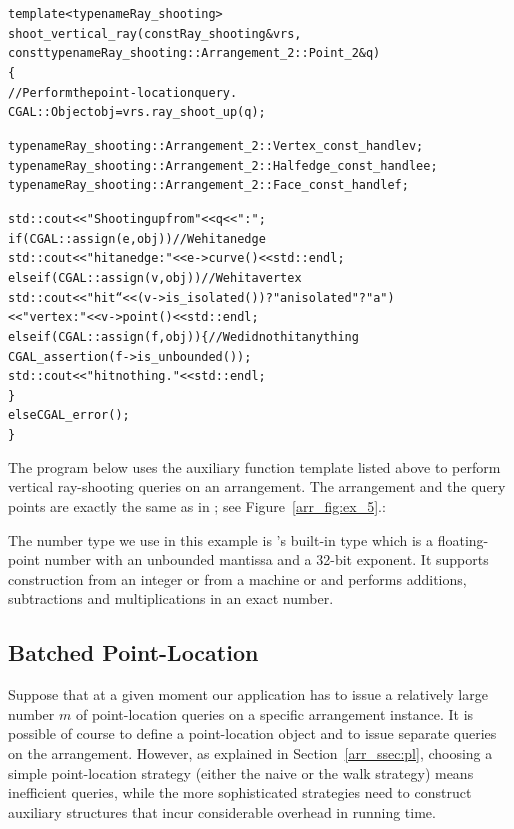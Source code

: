\begin{alltt}
template <typename Ray_shooting>
shoot_vertical_ray(const Ray_shooting& vrs,
                   const typename Ray_shooting::Arrangement_2::Point_2& q)
\{
  // Perform the point-location query.
  CGAL::Object    obj = vrs.ray_shoot_up (q);

  typename Ray_shooting::Arrangement_2::Vertex_const_handle    v;
  typename Ray_shooting::Arrangement_2::Halfedge_const_handle  e;
  typename Ray_shooting::Arrangement_2::Face_const_handle      f;

  std::cout << "Shooting up from " << q << " : "; 
  if (CGAL::assign (e, obj))                   // We hit an edge
    std::cout << "hit an edge: " << e->curve() << std::endl;
  else if (CGAL::assign (v, obj))              // We hit a vertex
    std::cout << "hit `` << (v->is_isolated()) ? "an isolated" ? "a")
              << "vertex: " << v->point() << std::endl;
  else if (CGAL::assign (f, obj)) \{           // We did not hit anything
    CGAL_assertion (f->is_unbounded());
    std::cout << "hit nothing." << std::endl; 
  \}
  else CGAL_error();
\}
\end{alltt}

The program below uses the auxiliary function template listed above to
perform vertical ray-shooting queries on an arrangement. The
arrangement and the query points are exactly the same as in
; see Figure~\ref{arr_fig:ex_5}.:


The number type we use in this example is \cgal's built-in
 type which is a floating-point number with an
unbounded mantissa and a 32-bit exponent. It supports construction from an
integer or from a machine  or  and performs additions,
subtractions and multiplications in an exact number.

\subsection{Batched Point-Location\label{arr_ssec:batched_pl}}
Suppose that at a given moment our application has to issue a
relatively large number $m$ of point-location queries on a
specific arrangement instance. It is possible of course to define
a point-location object and to issue separate queries on the
arrangement. However, as explained in Section~\ref{arr_ssec:pl},
choosing a simple point-location strategy (either the naive or
the walk strategy) means inefficient queries, while the more
sophisticated strategies need to construct auxiliary structures
that incur considerable overhead in running time.

